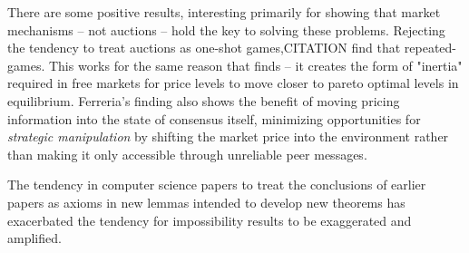 There are some positive results, interesting primarily for showing that market mechanisms -- not auctions -- hold the key to solving these problems. Rejecting the tendency to treat auctions as one-shot games,CITATION find that repeated-games. This works for the same reason that \citet{ferreira2021dynamic} finds -- it creates the form of "inertia" required in free markets for price levels to move closer to pareto optimal levels in equilibrium. Ferreria's finding also shows the benefit of moving pricing information into the state of consensus itself, minimizing opportunities for \textit{strategic manipulation} by shifting the market price into the environment rather than making it only accessible through unreliable peer messages.

The tendency in computer science papers to treat the conclusions of earlier papers as axioms in new lemmas intended to develop new theorems has exacerbated the tendency for impossibility results to be exaggerated and amplified. 

